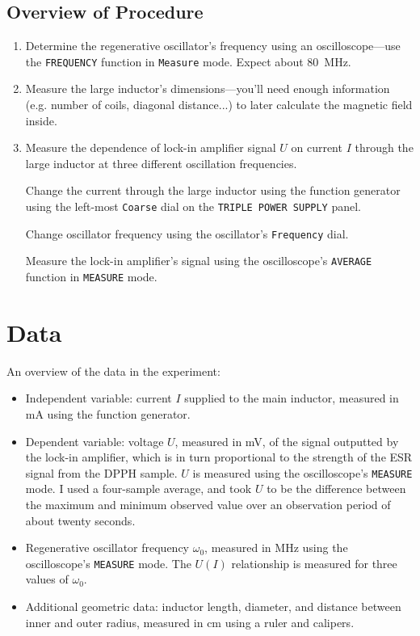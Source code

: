 \documentclass[11pt, a4paper]{article}
\begin{document}
\subsection{Overview of Procedure}
\begin{enumerate}
	\item Determine the regenerative oscillator's frequency using an oscilloscope---use the \texttt{FREQUENCY} function in \texttt{Measure} mode. Expect about \SI{80}{\mega \hertz}.
	
	\item Measure the large inductor's dimensions---you'll need enough information (e.g. number of coils, diagonal distance...) to later calculate the magnetic field inside.
	
	\item Measure the dependence of lock-in amplifier signal $ U $ on current $ I $ through the large inductor at three different oscillation frequencies.
	
	Change the current through the large inductor using the function generator using the left-most \texttt{Coarse} dial on the \texttt{TRIPLE POWER SUPPLY} panel.
	
	Change oscillator frequency using the oscillator's \texttt{Frequency} dial.
	
	Measure the lock-in amplifier's signal using the oscilloscope's \texttt{AVERAGE} function in \texttt{MEASURE} mode.
	
\end{enumerate}


\section{Data} 
An overview of the data in the experiment:
\begin{itemize}\renewcommand\labelitemi{--}
	\item Independent variable: current $ I $ supplied to the main inductor, measured in \si{\milli \ampere} using the function generator.
	
	\item Dependent variable: voltage $ U $, measured in \si{\milli \volt}, of the signal outputted by the lock-in amplifier, which is in turn proportional to the strength of the ESR signal from the DPPH sample. $ U $ is measured using the oscilloscope's \texttt{MEASURE} mode. I used a four-sample average, and took $ U $ to be the difference between the maximum and minimum observed value over an observation period of about twenty seconds.
	
	\item Regenerative oscillator frequency $ \omega_{0} $, measured in \si{\mega \hertz} using the oscilloscope's \texttt{MEASURE} mode. The $ U(I) $ relationship is measured for three values of $ \omega_{0} $. 
	
	\item Additional geometric data: inductor length, diameter, and distance between inner and outer radius, measured in \si{\centi \meter} using a ruler and calipers.
\end{itemize}
\end{document}
